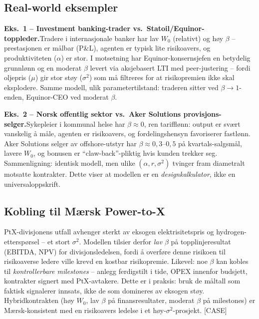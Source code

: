 \subsection*{Real-world eksempler}

\textbf{Eks.~1 -- Investment banking-trader vs.\ Statoil/Equinor-toppleder.}\quad [EKS]
Tradere i internasjonale banker har lav $W_0$ (relativt) og høy $\beta$ -- prestasjonen er målbar (P\&L), agenten er typisk lite risikoavers, og produktiviteten ($\alpha$) er stor. I motsetning har Equinor-konsernsjefen en betydelig grunnlønn og en moderat $\beta$ levert via aksjebasert LTI med peer-justering -- fordi oljepris ($\mu$) gir stor støy ($\sigma^{2}$) som må filtreres for at risikopremien ikke skal eksplodere. Samme modell, ulik parametertilstand: traderen sitter ved $\beta\to 1$-enden, Equinor-CEO ved moderat $\beta$.

\textbf{Eks.~2 -- Norsk offentlig sektor vs.\ Aker Solutions provisjons-selger.}\quad [EKS]
Sykepleier i kommunal helse har $\beta\approx 0$, ren tarifflønn: output er svært vanskelig å måle, agenten er risikoavers, og fordelingshensyn favoriserer fastlønn. Aker Solutions selger av offshore-utstyr har $\beta\approx 0{,}3$--$0{,}5$ på kvartals-salgsmål, lavere $W_0$, og bonusen er ``claw-back''-pliktig hvis kunden trekker seg. Sammenligning: identisk modell, men ulike $(\alpha,r,\sigma^{2})$ tvinger fram diametralt motsatte kontrakter. Dette viser at modellen er en \emph{designkalkulator}, ikke en universaloppskrift.

\subsection*{Kobling til Mærsk Power-to-X}
PtX-divisjonens utfall avhenger sterkt av eksogen elektrisitetspris og hydrogen-etterspørsel -- et stort $\sigma^{2}$. Modellen tilsier derfor \emph{lav $\beta$} på topplinjeresultat (EBITDA, NPV) for divisjonsledelsen, fordi å overføre denne risikoen til risikoaverse ledere ville krevd en kostbar risikopremie. Likevel: noe $\beta$ kan kobles til \emph{kontrollerbare milestones} -- anlegg ferdigstilt i tide, OPEX innenfor budsjett, kontrakter signert med PtX-avtakere. Dette er  i praksis: bruk de måltall som faktisk signalerer innsats, ikke de som domineres av eksogen støy. Hybridkontrakten (høy $W_0$, lav $\beta$ på finansresultater, moderat $\beta$ på milestones) er Mærsk-konsistent med en risikoavers ledelse i et høy-$\sigma^{2}$-prosjekt. [CASE]

